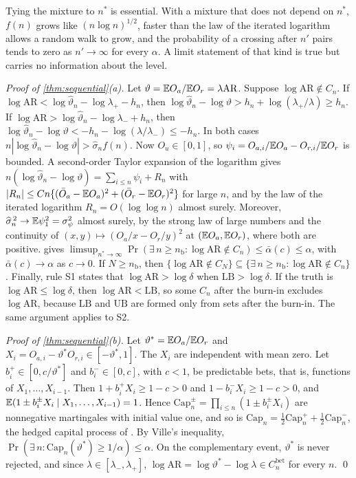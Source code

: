 Tying the mixture to $n^\ast$ is essential. With a mixture that does not depend on $n^\ast$, $f(n)$ grows like $(n\log n)^{1/2}$, faster than the law of the iterated logarithm allows a random walk to grow, and the probability of a crossing after $n'$ pairs tends to zero as $n'\to\infty$ for every $\alpha$. A limit statement of that kind is true but carries no information about the level.

\emph{Proof of \cref{thm:sequential}(a).} Let $\vartheta=\mathbb{E} O_a/\mathbb{E} O_r=\lambda\mathrm{AR}$. Suppose $\log\mathrm{AR}\notin C_n$. If $\log\mathrm{AR}<\log\widehat\vartheta_n-\log\lambda_+-h_n$, then $\log\widehat\vartheta_n-\log\vartheta>h_n+\log(\lambda_+/\lambda)\ge h_n$. If $\log\mathrm{AR}>\log\widehat\vartheta_n-\log\lambda_-+h_n$, then $\log\widehat\vartheta_n-\log\vartheta<-h_n-\log(\lambda/\lambda_-)\le-h_n$. In both cases $n|\log\widehat\vartheta_n-\log\vartheta|>\widehat\sigma_nf(n)$. Now $O_u\in[0,1]$, so $\psi_i=O_{a,i}/\mathbb{E} O_a-O_{r,i}/\mathbb{E} O_r$ is bounded. A second-order Taylor expansion of the logarithm gives $n(\log\widehat\vartheta_n-\log\vartheta)=\sum_{i\le n}\psi_i+R_n$ with $|R_n|\le Cn\{(\bar O_a-\mathbb{E} O_a)^2+(\bar O_r-\mathbb{E} O_r)^2\}$ for large $n$, and by the law of the iterated logarithm $R_n=O(\log\log n)$ almost surely. Moreover, $\widehat\sigma_n^{\,2}\to\mathbb{E}\psi_1^2=\sigma^2_\psi$ almost surely, by the strong law of large numbers and the continuity of $(x,y)\mapsto(O_a/x-O_r/y)^2$ at $(\mathbb{E} O_a,\mathbb{E} O_r)$, where both are positive.  gives $\limsup_{n^\ast\to\infty}\Pr(\exists\,n\ge n_{\mathrm b}:\log\mathrm{AR}\notin C_n)\le\bar\alpha(c)\le\alpha$, with $\bar\alpha(c)\to\alpha$ as $c\to0$. If $N\ge n_{\mathrm b}$, then $\{\log\mathrm{AR}\notin C_N\}\subseteq\{\exists\,n\ge n_{\mathrm b}:\log\mathrm{AR}\notin C_n\}$. Finally, rule S1 states that $\log\mathrm{AR}>\log\delta$ when $\mathrm{LB}>\log\delta$. If the truth is $\log\mathrm{AR}\le\log\delta$, then $\log\mathrm{AR}<\mathrm{LB}$, so some $C_n$ after the burn-in excludes $\log\mathrm{AR}$, because $\mathrm{LB}$ and $\mathrm{UB}$ are formed only from sets after the burn-in. The same argument applies to S2.

\emph{Proof of \cref{thm:sequential}(b).} Let $\vartheta^\ast=\mathbb{E} O_a/\mathbb{E} O_r$ and $X_i=O_{a,i}-\vartheta^\ast O_{r,i}\in[-\vartheta^\ast,1]$. The $X_i$ are independent with mean zero. Let $b^+_i\in[0,c/\vartheta^\ast]$ and $b^-_i\in[0,c]$, with $c<1$, be predictable bets, that is, functions of $X_1,\dots,X_{i-1}$. Then $1+b^+_iX_i\ge1-c>0$ and $1-b^-_iX_i\ge1-c>0$, and $\mathbb{E}(1\pm b^\pm_iX_i\mid X_1,\dots,X_{i-1})=1$. Hence $\mathrm{Cap}^\pm_n=\prod_{i\le n}(1\pm b^\pm_iX_i)$ are nonnegative martingales with initial value one, and so is $\mathrm{Cap}_n=\frac12\mathrm{Cap}^+_n+\frac12\mathrm{Cap}^-_n$, the hedged capital process of \citet{waudbysmith2024betting}. By Ville's inequality, $\Pr(\exists\,n:\mathrm{Cap}_n(\vartheta^\ast)\ge1/\alpha)\le\alpha$. On the complementary event, $\vartheta^\ast$ is never rejected, and since $\lambda\in[\lambda_-,\lambda_+]$, $\log\mathrm{AR}=\log\vartheta^\ast-\log\lambda\in C^{\mathrm{bet}}_n$ for every $n$.
\qed

